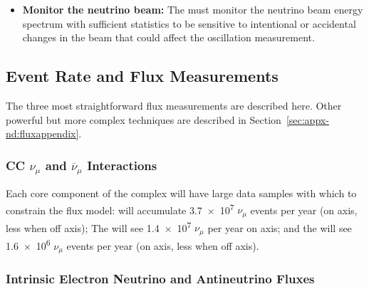 \begin{itemize}
    \item{{\bf Monitor the neutrino beam:}} The  must monitor the neutrino beam energy spectrum with sufficient statistics to be sensitive to intentional or accidental changes in the beam that could affect the oscillation measurement.
    
    
\end{itemize}

\subsection{Event Rate and Flux Measurements}

The three most straightforward flux measurements are described here. Other powerful but more complex techniques are described in Section~\ref{sec:appx-nd:fluxappendix}.

\subsubsection{CC $\nu_{\mu}$ and $\overline{\nu}_{\mu}$ Interactions}
Each core component of the  complex will have large data samples with which to constrain the flux model:   will accumulate \num{3.7e7}  $\nu_{\mu}$ events per year (on axis, less when off axis);  The  will see \num{1.4e7}  $\nu_{\mu}$ per year on axis; and the  will see \num{1.6e6}  $\nu_{\mu}$ events per year (on axis, less when off axis). 


\subsubsection{Intrinsic Electron Neutrino and Antineutrino Fluxes}

